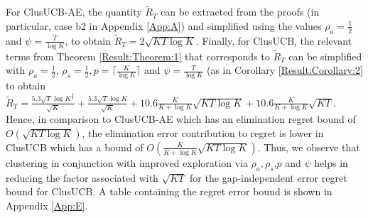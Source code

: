 For ClusUCB-AE, the quantity $\tilde R_T$ can be extracted from the proofs (in particular, case b2 in Appendix \ref{App:A}) and simplified using the values $\rho_{a}=\frac{1}{2}$ and $\psi=\frac{T}{\log K}$, to obtain $\tilde R_T = 2\sqrt{KT\log K}$. 
Finally, for ClusUCB, the relevant terms from Theorem \ref{Result:Theorem:1} that corresponds to $\tilde R_T$ can be simplified with $\rho_{a}=\frac{1}{2}$, $\rho_{s}=\frac{1}{2},p=\big\lceil \frac{K}{\log K} \big\rceil$ and $\psi=\frac{T}{\log K}$ (as in Corollary \ref{Result:Corollary:2} to obtain  
$\tilde R_T = \frac{5.3 \sqrt{T}\log K^{\frac{3}{2}} }{\sqrt{K}} + \frac{5.3 \sqrt{T}\log K}{\sqrt{K}} + 10.6 \frac{K}{K+\log K}\sqrt{KT\log K} + 10.6 \frac{K}{K+\log K}\sqrt{KT}$. Hence, in comparison to ClusUCB-AE which has an elimination regret bound of $O(\sqrt{KT\log K})$, the elimination error contribution to regret is lower in ClusUCB which has a bound of $O(\frac{K}{K+\log K}\sqrt{KT\log K})$. Thus, we observe that clustering in conjunction with improved exploration via $\rho_{a},\rho_{s}$,$p$ and $\psi$ helps in reducing the factor associated with $\sqrt{KT}$ for the gap-independent error regret bound for ClusUCB. A table containing the regret error bound is shown in Appendix \ref{App:E}. 
